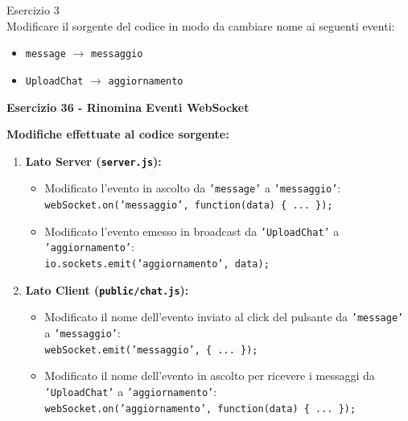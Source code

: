 \documentclass[11pt]{article}
\begin{document}
\begin{tcolorbox}[colback=blue!5!white,colframe=blue!75!black,title=\textbf{DOMANDA}, breakable]
Esercizio 3\\
Modificare il sorgente del codice in modo da cambiare nome ai seguenti eventi:
\begin{itemize}
    \item \texttt{message} $\rightarrow$ \texttt{messaggio}
    \item \texttt{UploadChat} $\rightarrow$ \texttt{aggiornamento}
\end{itemize}
\end{tcolorbox}

\begin{tcolorbox}[colback=green!5!white,colframe=green!75!black,title=\textbf{RISPOSTA}, breakable]
\textbf{Esercizio 36 - Rinomina Eventi WebSocket}

\textbf{Modifiche effettuate al codice sorgente:}

\begin{enumerate}
    \item \textbf{Lato Server (\texttt{server.js}):}
    \begin{itemize}
        \item Modificato l'evento in ascolto da \texttt{'message'} a \texttt{'messaggio'}:\\
        \texttt{webSocket.on('messaggio', function(data) \{ ... \});}
        \item Modificato l'evento emesso in broadcast da \texttt{'UploadChat'} a \texttt{'aggiornamento'}:\\
        \texttt{io.sockets.emit('aggiornamento', data);}
    \end{itemize}

    \item \textbf{Lato Client (\texttt{public/chat.js}):}
    \begin{itemize}
        \item Modificato il nome dell'evento inviato al click del pulsante da \texttt{'message'} a \texttt{'messaggio'}:\\
        \texttt{webSocket.emit('messaggio', \{ ... \});}
        \item Modificato il nome dell'evento in ascolto per ricevere i messaggi da \texttt{'UploadChat'} a \texttt{'aggiornamento'}:\\
        \texttt{webSocket.on('aggiornamento', function(data) \{ ... \});}
    \end{itemize}
\end{enumerate}
\end{tcolorbox}
\end{document}
